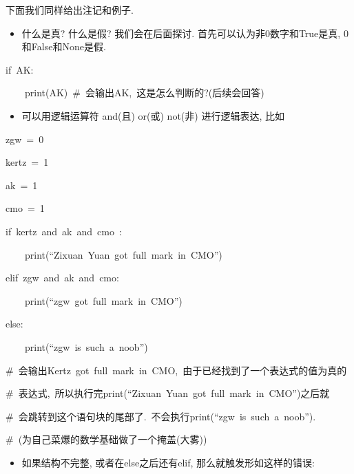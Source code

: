 下面我们同样给出注记和例子.
\begin{itemize}
\item 什么是真? 什么是假? 我们会在后面探讨. 首先可以认为非0数字和True是真, 0和False和None是假. 
\end{itemize}
\begin{lyxcode}
if~\textquotedbl AK\textquotedbl :

~~~~print(\textquotedbl AK\textquotedbl )~\#~会输出AK,~这是怎么判断的?(后续会回答)
\end{lyxcode}
\begin{itemize}
\item 可以用逻辑运算符 and(且) or(或) not(非) 进行逻辑表达, 比如
\end{itemize}
\begin{lyxcode}
zgw~=~0

kertz~=~1

ak~=~1

cmo~=~1

if~kertz~and~ak~and~cmo~:

~~~~print(``Zixuan~Yuan~got~full~mark~in~CMO'')

elif~zgw~and~ak~and~cmo:

~~~~print(``zgw~got~full~mark~in~CMO'')

else:

~~~~print(``zgw~is~such~a~noob'')

\#~会输出Kertz~got~full~mark~in~CMO,~由于已经找到了一个表达式的值为真的

\#~表达式,~所以执行完print(``Zixuan~Yuan~got~full~mark~in~CMO'')之后就

\#~会跳转到这个语句块的尾部了.~不会执行print(``zgw~is~such~a~noob'').

\#~(为自己菜爆的数学基础做了一个掩盖(大雾))
\end{lyxcode}
\begin{itemize}
\item 如果结构不完整, 或者在else之后还有elif, 那么就触发形如这样的错误:
\end{itemize}
